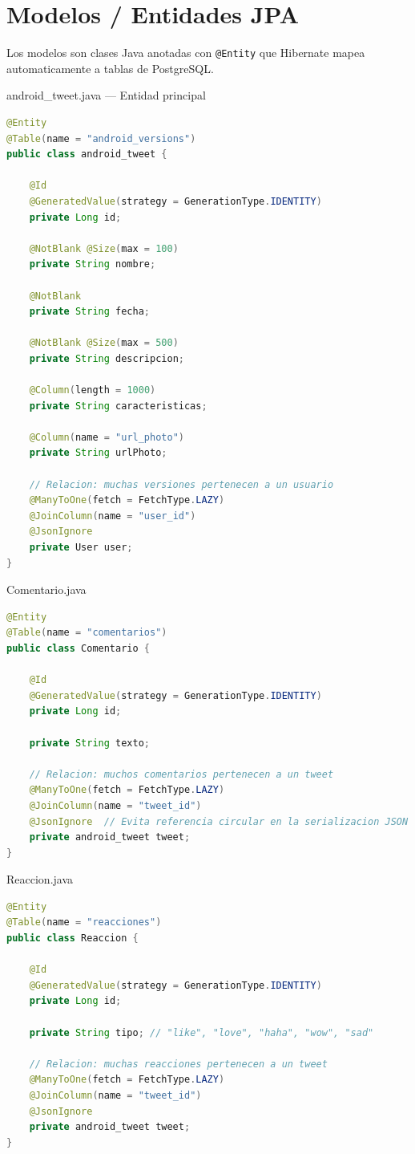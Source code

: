 \documentclass[12pt,a4paper]{article}
\begin{document}
\section{Modelos / Entidades JPA}

Los modelos son clases Java anotadas con \texttt{@Entity} que Hibernate
mapea automaticamente a tablas de PostgreSQL.

\begin{filebox}{android\_tweet.java --- Entidad principal}
\begin{lstlisting}[language=Java]
@Entity
@Table(name = "android_versions")
public class android_tweet {

    @Id
    @GeneratedValue(strategy = GenerationType.IDENTITY)
    private Long id;

    @NotBlank @Size(max = 100)
    private String nombre;

    @NotBlank
    private String fecha;

    @NotBlank @Size(max = 500)
    private String descripcion;

    @Column(length = 1000)
    private String caracteristicas;

    @Column(name = "url_photo")
    private String urlPhoto;

    // Relacion: muchas versiones pertenecen a un usuario
    @ManyToOne(fetch = FetchType.LAZY)
    @JoinColumn(name = "user_id")
    @JsonIgnore
    private User user;
}
\end{lstlisting}
\end{filebox}

\begin{filebox}{Comentario.java}
\begin{lstlisting}[language=Java]
@Entity
@Table(name = "comentarios")
public class Comentario {

    @Id
    @GeneratedValue(strategy = GenerationType.IDENTITY)
    private Long id;

    private String texto;

    // Relacion: muchos comentarios pertenecen a un tweet
    @ManyToOne(fetch = FetchType.LAZY)
    @JoinColumn(name = "tweet_id")
    @JsonIgnore  // Evita referencia circular en la serializacion JSON
    private android_tweet tweet;
}
\end{lstlisting}
\end{filebox}

\begin{filebox}{Reaccion.java}
\begin{lstlisting}[language=Java]
@Entity
@Table(name = "reacciones")
public class Reaccion {

    @Id
    @GeneratedValue(strategy = GenerationType.IDENTITY)
    private Long id;

    private String tipo; // "like", "love", "haha", "wow", "sad"

    // Relacion: muchas reacciones pertenecen a un tweet
    @ManyToOne(fetch = FetchType.LAZY)
    @JoinColumn(name = "tweet_id")
    @JsonIgnore
    private android_tweet tweet;
}
\end{lstlisting}
\end{filebox}
\end{document}
